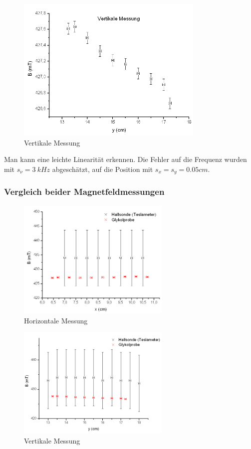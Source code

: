 \begin{figure}[H]
\centering \includegraphics[width=0.8\textwidth]{Bilder/homvert.png}
\caption{Vertikale Messung}
\end{figure}

Man kann eine leichte Linearität erkennen. Die Fehler auf die Frequenz wurden mit $s_\nu=3\ kHz$ abgeschätzt, auf die Position mit $s_x=s_y=0.05cm$.

\subsubsection{Vergleich beider Magnetfeldmessungen}

\begin{figure}[H]
\centering \includegraphics[width=0.65\textwidth]{Bilder/VGLx.png}
\caption{Horizontale Messung}
\end{figure}

\begin{figure}[H]
\centering \includegraphics[width=0.65\textwidth]{Bilder/VGLy.png}
\caption{Vertikale Messung}
\end{figure}

